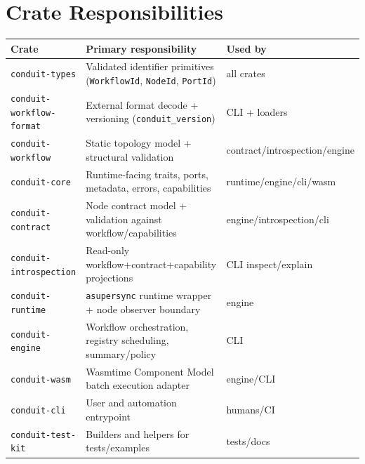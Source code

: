 \documentclass[
  letterpaper,
]{report}
\begin{document}
\section{Crate Responsibilities}\label{crate-responsibilities}

\begin{longtable}[]{@{}
  >{\raggedright\arraybackslash}p{}
  >{\raggedright\arraybackslash}p{}
  >{\raggedright\arraybackslash}p{}@{}}
\toprule\noalign{}
\begin{minipage}[b]{\linewidth}\raggedright
Crate
\end{minipage} & \begin{minipage}[b]{\linewidth}\raggedright
Primary responsibility
\end{minipage} & \begin{minipage}[b]{\linewidth}\raggedright
Used by
\end{minipage} \\
\midrule\noalign{}
\endhead
\bottomrule\noalign{}
\endlastfoot
\texttt{conduit-types} & Validated identifier primitives
(\texttt{WorkflowId}, \texttt{NodeId}, \texttt{PortId}) & all crates \\
\texttt{conduit-workflow-format} & External format decode + versioning
(\texttt{conduit\_version}) & CLI + loaders \\
\texttt{conduit-workflow} & Static topology model + structural
validation & contract/introspection/engine \\
\texttt{conduit-core} & Runtime-facing traits, ports, metadata, errors,
capabilities & runtime/engine/cli/wasm \\
\texttt{conduit-contract} & Node contract model + validation against
workflow/capabilities & engine/introspection/cli \\
\texttt{conduit-introspection} & Read-only workflow+contract+capability
projections & CLI inspect/explain \\
\texttt{conduit-runtime} & \texttt{asupersync} runtime wrapper + node
observer boundary & engine \\
\texttt{conduit-engine} & Workflow orchestration, registry scheduling,
summary/policy & CLI \\
\texttt{conduit-wasm} & Wasmtime Component Model batch execution adapter
& engine/CLI \\
\texttt{conduit-cli} & User and automation entrypoint & humans/CI \\
\texttt{conduit-test-kit} & Builders and helpers for tests/examples &
tests/docs \\
\end{longtable}
\end{document}
